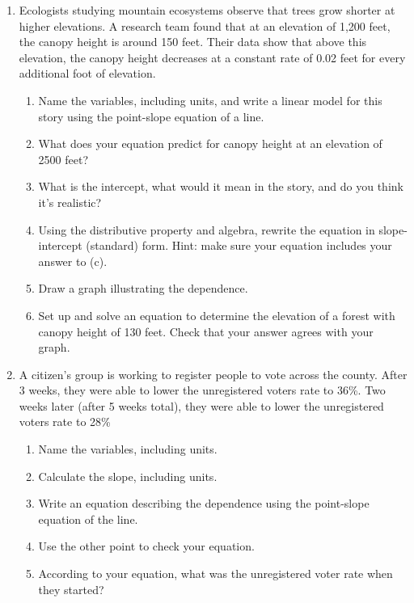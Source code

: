 \begin{enumerate}
\item %
Ecologists studying mountain ecosystems observe that trees grow shorter at higher elevations. A research team found that at an elevation of 1,200 feet, the canopy height is around 150 feet. Their data show that above this elevation, the canopy height decreases at a constant rate of 0.02 feet for every additional foot of elevation.
\begin{enumerate}
    \item Name the variables, including units, and write a linear model for this story using the point-slope equation of a line.
    \item What does your equation predict for canopy height at an elevation of 2500 feet?
    \item What is the intercept, what would it mean in the story, and do you think it's realistic? 
    \item Using the distributive property and algebra, rewrite the equation in slope-intercept (standard) form. Hint: make sure your equation includes your answer to (c).
    \item Draw a graph illustrating the dependence.
    \item Set up and solve an equation to determine the elevation of a forest with canopy height of 130 feet.  Check that your answer agrees with your graph.
\end{enumerate}

\item %
A citizen's group is working to register people to vote across the county. After 3 weeks, they were able to lower the unregistered voters rate to 36\%. Two weeks later (after 5 weeks total), they were able to lower the unregistered voters rate to 28\%
\begin{enumerate}
   \item Name the variables, including units.
   \item Calculate the slope, including units.
   \item Write an equation describing the dependence using the point-slope equation of the line.
   \item Use the other point to check your equation.
   \item According to your equation, what was the unregistered voter rate when they started?
\end{enumerate}


\end{enumerate}
